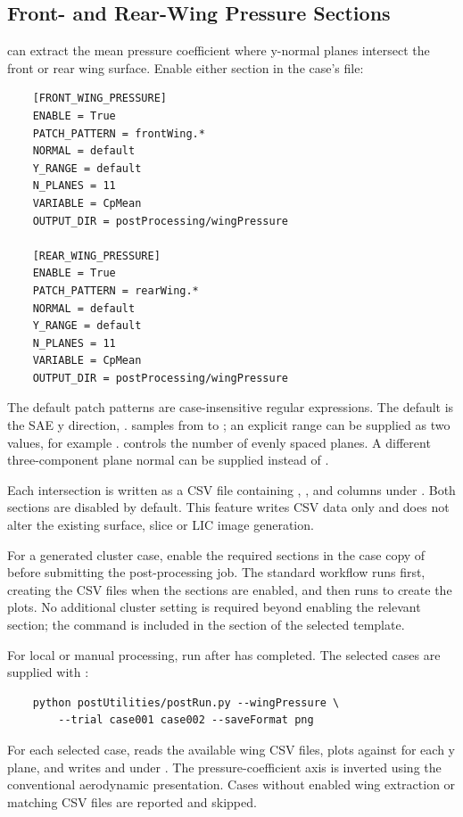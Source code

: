 \subsection{Front- and Rear-Wing Pressure Sections}
 can extract the mean pressure coefficient where y-normal planes intersect the front or rear wing surface. Enable either section in the case's  file:
\begin{lstlisting}
    [FRONT_WING_PRESSURE]
    ENABLE = True
    PATCH_PATTERN = frontWing.*
    NORMAL = default
    Y_RANGE = default
    N_PLANES = 11
    VARIABLE = CpMean
    OUTPUT_DIR = postProcessing/wingPressure

    [REAR_WING_PRESSURE]
    ENABLE = True
    PATCH_PATTERN = rearWing.*
    NORMAL = default
    Y_RANGE = default
    N_PLANES = 11
    VARIABLE = CpMean
    OUTPUT_DIR = postProcessing/wingPressure
\end{lstlisting}
The default patch patterns are case-insensitive regular expressions. The default  is the SAE y direction, .  samples from  to ; an explicit range can be supplied as two values, for example \codeword{[-0.4,0.4]}.  controls the number of evenly spaced planes. A different three-component plane normal can be supplied instead of .

Each intersection is written as a CSV file containing , ,  and  columns under . Both sections are disabled by default. This feature writes CSV data only and does not alter the existing surface, slice or LIC image generation.

For a generated cluster case, enable the required sections in the case copy of  before submitting the post-processing job. The standard  workflow runs  first, creating the CSV files when the sections are enabled, and then runs  to create the plots. No additional cluster setting is required beyond enabling the relevant section; the command is included in the  section of the selected  template.

For local or manual processing, run  after  has completed. The selected cases are supplied with :
\begin{lstlisting}
    python postUtilities/postRun.py --wingPressure \
        --trial case001 case002 --saveFormat png
\end{lstlisting}
For each selected case,  reads the available wing CSV files, plots  against  for each y plane, and writes  and  under . The pressure-coefficient axis is inverted using the conventional aerodynamic presentation. Cases without enabled wing extraction or matching CSV files are reported and skipped.

